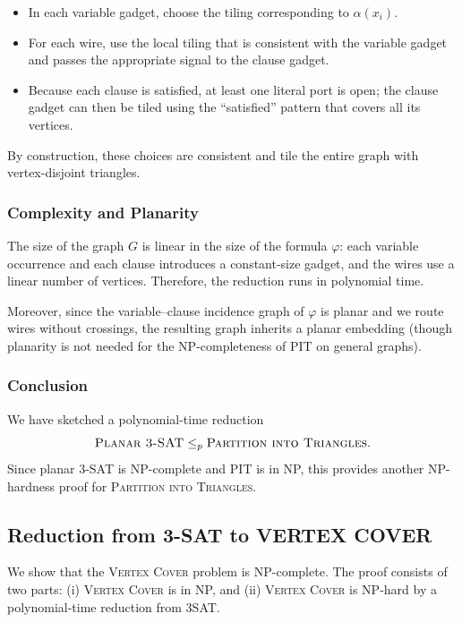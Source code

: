 \documentclass[9pt]{extarticle}
\begin{document}
\begin{itemize}
    \item In each variable gadget, choose the tiling corresponding to
          $\alpha(x_i)$.
    \item For each wire, use the local tiling that is consistent with the
          variable gadget and passes the appropriate signal to the clause
          gadget.
    \item Because each clause is satisfied, at least one literal port is open;
          the clause gadget can then be tiled using the “satisfied” pattern that
          covers all its vertices.
\end{itemize}

By construction, these choices are consistent and tile the entire graph with
vertex-disjoint triangles.

\subsubsection*{Complexity and Planarity}

The size of the graph $G$ is linear in the size of the formula $\varphi$:
each variable occurrence and each clause introduces a constant-size gadget, and
the wires use a linear number of vertices.  Therefore, the reduction runs in
polynomial time.

Moreover, since the variable–clause incidence graph of $\varphi$ is planar and
we route wires without crossings, the resulting graph inherits a planar
embedding (though planarity is not needed for the NP-completeness of PIT on
general graphs).

\subsubsection*{Conclusion}

We have sketched a polynomial-time reduction
\[
    \textsc{Planar 3-SAT} \le_p \textsc{Partition into Triangles}.
\]
Since planar 3-SAT is NP-complete and PIT is in NP, this provides another
NP-hardness proof for \textsc{Partition into Triangles}.

\subsection{Reduction from 3-SAT to VERTEX COVER}

We show that the \textsc{Vertex Cover} problem is NP-complete.  
The proof consists of two parts: (i) \textsc{Vertex Cover} is in NP, and  
(ii) \textsc{Vertex Cover} is NP-hard by a polynomial-time reduction from 3SAT.
\end{document}
